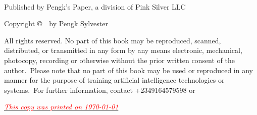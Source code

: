 \newpage
\begin{fullwidth}
~\vfill
\thispagestyle{empty}
\setlength{\parindent}{0pt}
\setlength{\parskip}{\baselineskip}

Published by Pengk's Paper, a division of Pink Silver LLC

Copyright \copyright\ \the\year\ by Pengk Sylvester

\par All rights reserved. No part of this book may be reproduced, scanned, distributed, or transmitted in any form by any means electronic, mechanical, photocopy, recording or otherwise without the prior written consent of the author.\ Please note that no part of this book may be used or reproduced in any manner for the purpose of training artificial intelligence technologies or systems.\ For further information, contact +2349164579598 or 

\hyperlink{1245%
}{\textit{\textcolor{red}{This copy was printed on \today}}}
\end{fullwidth}

\newpage
